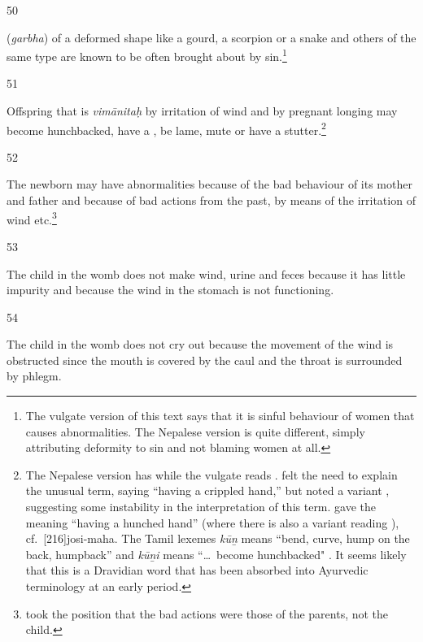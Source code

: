 \begin{translation}
\item [50]

 (\emph{garbha}) of a deformed 
shape like a gourd, a scorpion or a snake and 
others of the same type are known to be often brought about by 
sin.\footnote{The vulgate version of this text says that it is sinful behaviour of 
women that causes abnormalities.  The Nepalese version is quite different, 
simply attributing deformity to sin and not blaming women at all.}

\item [51]

Offspring that is \emph{vimānitaḥ} by irritation
of wind and by pregnant longing may become hunchbacked, have a
, be lame, mute or have a
stutter.\footnote{The Nepalese version has  while the
    vulgate reads .  felt the need to
    explain the unusual term, saying  “having a
    crippled hand,” but \citet[footnote 5]{acar-1939} noted a variant
    , suggesting some instability in the interpretation
    of this term.  gave the meaning 
    “having a hunched hand” (where there is also a variant reading
    ), cf.\ [216]{josi-maha}.   The Tamil
    lexemes\emph{ kū\b n} means “bend, curve, hump on the back, humpback”
    and \emph{kū\b ni} means “\ldots\ become hunchbacked"
    \citep[\#1927]{DED}. It seems likely that this is a Dravidian word
    that has been absorbed into Ayurvedic terminology at an early
    period.}
    
\item[52]

The newborn may have abnormalities because of the bad behaviour of
its mother and father and because of bad actions from the past,
by means of the irritation of wind etc.\footnote{
    took the position that the bad actions were those of the parents, not
    the child.}

\item[53]

The child in the womb does not make wind, urine and feces because it has little 
impurity and because the wind in the stomach is not functioning.

\item[54] 

The child in the womb does not cry out because the movement of the wind is 
obstructed since the mouth is covered by the caul and the throat is surrounded 
by phlegm. 


\end{translation}

